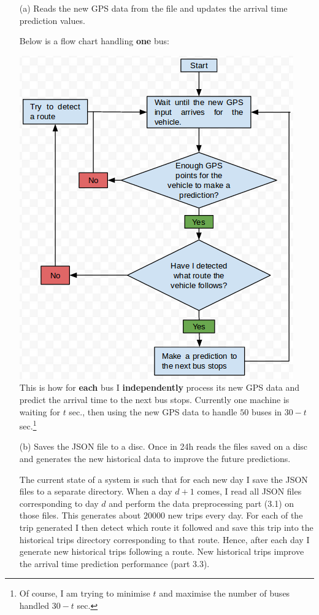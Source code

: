 \documentclass[12pt,a4paper,oneside,openright]{report}
\begin{document}
\begin{enumerate}

\item[(a)] Reads the new GPS data from the file and updates the arrival time
prediction values.

Below is a flow chart handling
\textbf{one} bus:

\includegraphics[scale = 0.6]{figs/flowchart.png} \\

This is how for \textbf{each} bus I \textbf{independently} process its new GPS data
and predict the arrival time to the next bus stops. Currently one machine is
waiting for $t$ sec., then using the new GPS data to handle $50$ buses in 
$30 - t$ sec.\footnote{Of course, I am trying to minimise $t$ and maximise the number of buses
handled $30 - t$ sec.}

\item[(b)] Saves the JSON file to a disc. Once in 24h reads the files saved on a disc
and generates the new historical data to improve the future predictions.

The current state of a system is such that for each new day I save the JSON files
to a separate directory. When a day $d+1$ comes, I read all JSON files corresponding
to day $d$ and perform the data preprocessing part (3.1) on those files. This generates
about $20000$ new trips every day. For each of the trip generated I then detect
which route it followed and save this trip into the historical trips directory
corresponding to that route. Hence, after each day I generate new historical trips
following a route. New historical trips improve the arrival time prediction
performance (part 3.3).


\end{enumerate}
\end{document}
